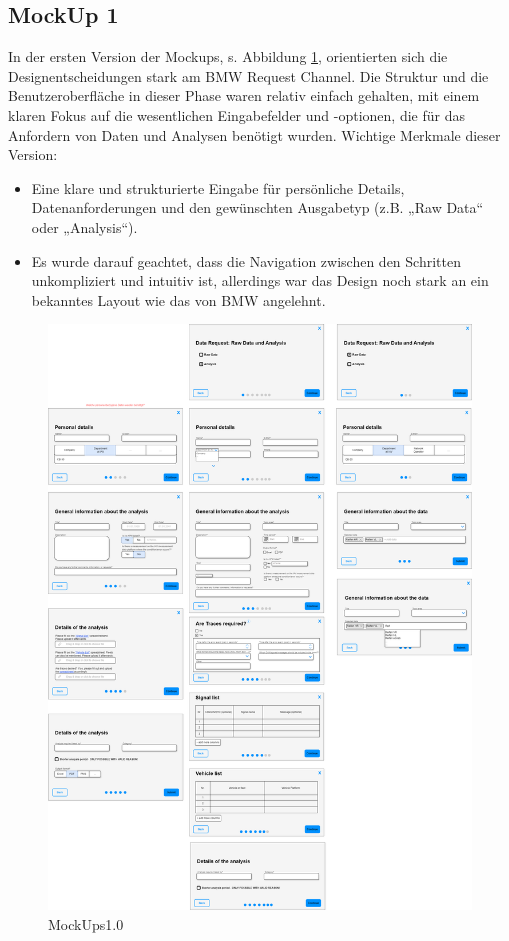 \subsection*{MockUp 1}
In der ersten Version der Mockups, s. Abbildung \ref{fig:MockUps1.0}, orientierten sich die Designentscheidungen stark am BMW Request Channel. Die Struktur und die Benutzeroberfläche in dieser Phase waren relativ einfach gehalten, mit einem klaren Fokus auf die wesentlichen Eingabefelder und -optionen, die für das Anfordern von Daten und Analysen benötigt wurden.
\newline
Wichtige Merkmale dieser Version:
\begin{itemize}
    \item Eine klare und strukturierte Eingabe für persönliche Details, Datenanforderungen und den gewünschten Ausgabetyp (z.B. „Raw Data“ oder „Analysis“).
    \item Es wurde darauf geachtet, dass die Navigation zwischen den Schritten unkompliziert und intuitiv ist, allerdings war das Design noch stark an ein bekanntes Layout wie das von BMW angelehnt.
\end{itemize}
\begin{figure}[H]
    \centering
    \includegraphics[scale=.2]{media/MockUps1.0}
    \caption{MockUps1.0}
    \label{fig:MockUps1.0}
\end{figure}
